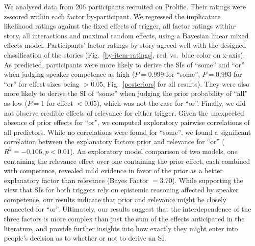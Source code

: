 \documentclass[11pt,letterpaper]{article}
\begin{document}
We analysed data from 206 participants recruited on Prolific. Their ratings were z-scored within each factor by-participant. 
We regressed the implicature likelihood ratings against the fixed effects of trigger, all factor ratings within-story, all interactions and maximal  random effects, using a Bayesian linear mixed effects model. 
Participants' factor ratings by-story agreed well with the designed classification of the stories (Fig.~\ref{by-item-ratings}, red~vs.~blue color on x-axis).
As predicted, participants were more likely to derive the SIs of ``some'' and ``or'' when judging speaker competence as high ($P=0.999$ for ``some'',  $P=0.993$ for ``or'' for effect sizes being $>0.05$, Fig.~\ref{posteriors} for all results). 
They were also more likely to derive the SI of ``some'' when judging the prior probability of ``all'' as low ($P= 1$ for effect $<0.05$), which was not the case for ``or''. %
Finally, we did not observe credible effects of relevance for either trigger.
Given the unexpected absence of prior effects for ``or'', we computed exploratory pairwise correlations of all predictors. While no correlations were found for ``some'', we found a significant correlation between the explanatory factors prior and relevance for ``or'' ($R^2=-0.106, p<0.01$). %
An exploratory model comparison of two models, one containing the relevance effect over one containing the prior effect, each combined with competence, revealed mild evidence in favor of the prior as a better explanatory factor than relevance (Bayes Factor $ = 3.70$). %
While supporting the view that SIs for both triggers rely on epistemic reasoning affected by speaker competence, our results indicate that prior and relevance might be closely connected for ``or''.
Ultimately, our results suggest that the interdependence of the three factors is more complex than just the sum of the effects anticipated in the literature, and provide further insights into how exactly they might enter into people’s decision as to whether or not to derive an SI.
\end{document}
